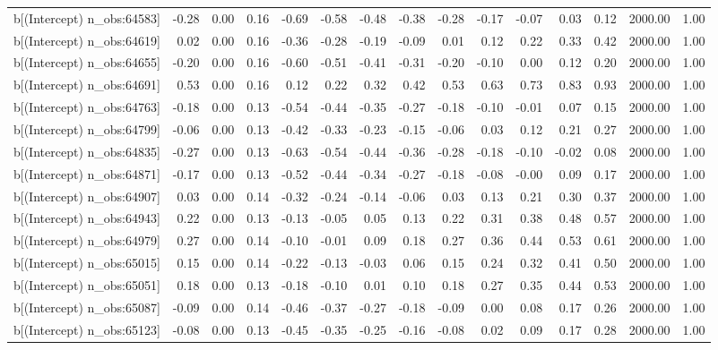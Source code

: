 \begin{table}[ht]
\begin{tabular}{rrrrrrrrrrrrrrr}
  b[(Intercept) n\_obs:64583] & -0.28 & 0.00 & 0.16 & -0.69 & -0.58 & -0.48 & -0.38 & -0.28 & -0.17 & -0.07 & 0.03 & 0.12 & 2000.00 & 1.00 \\ 
  b[(Intercept) n\_obs:64619] & 0.02 & 0.00 & 0.16 & -0.36 & -0.28 & -0.19 & -0.09 & 0.01 & 0.12 & 0.22 & 0.33 & 0.42 & 2000.00 & 1.00 \\ 
  b[(Intercept) n\_obs:64655] & -0.20 & 0.00 & 0.16 & -0.60 & -0.51 & -0.41 & -0.31 & -0.20 & -0.10 & 0.00 & 0.12 & 0.20 & 2000.00 & 1.00 \\ 
  b[(Intercept) n\_obs:64691] & 0.53 & 0.00 & 0.16 & 0.12 & 0.22 & 0.32 & 0.42 & 0.53 & 0.63 & 0.73 & 0.83 & 0.93 & 2000.00 & 1.00 \\ 
  b[(Intercept) n\_obs:64763] & -0.18 & 0.00 & 0.13 & -0.54 & -0.44 & -0.35 & -0.27 & -0.18 & -0.10 & -0.01 & 0.07 & 0.15 & 2000.00 & 1.00 \\ 
  b[(Intercept) n\_obs:64799] & -0.06 & 0.00 & 0.13 & -0.42 & -0.33 & -0.23 & -0.15 & -0.06 & 0.03 & 0.12 & 0.21 & 0.27 & 2000.00 & 1.00 \\ 
  b[(Intercept) n\_obs:64835] & -0.27 & 0.00 & 0.13 & -0.63 & -0.54 & -0.44 & -0.36 & -0.28 & -0.18 & -0.10 & -0.02 & 0.08 & 2000.00 & 1.00 \\ 
  b[(Intercept) n\_obs:64871] & -0.17 & 0.00 & 0.13 & -0.52 & -0.44 & -0.34 & -0.27 & -0.18 & -0.08 & -0.00 & 0.09 & 0.17 & 2000.00 & 1.00 \\ 
  b[(Intercept) n\_obs:64907] & 0.03 & 0.00 & 0.14 & -0.32 & -0.24 & -0.14 & -0.06 & 0.03 & 0.13 & 0.21 & 0.30 & 0.37 & 2000.00 & 1.00 \\ 
  b[(Intercept) n\_obs:64943] & 0.22 & 0.00 & 0.13 & -0.13 & -0.05 & 0.05 & 0.13 & 0.22 & 0.31 & 0.38 & 0.48 & 0.57 & 2000.00 & 1.00 \\ 
  b[(Intercept) n\_obs:64979] & 0.27 & 0.00 & 0.14 & -0.10 & -0.01 & 0.09 & 0.18 & 0.27 & 0.36 & 0.44 & 0.53 & 0.61 & 2000.00 & 1.00 \\ 
  b[(Intercept) n\_obs:65015] & 0.15 & 0.00 & 0.14 & -0.22 & -0.13 & -0.03 & 0.06 & 0.15 & 0.24 & 0.32 & 0.41 & 0.50 & 2000.00 & 1.00 \\ 
  b[(Intercept) n\_obs:65051] & 0.18 & 0.00 & 0.13 & -0.18 & -0.10 & 0.01 & 0.10 & 0.18 & 0.27 & 0.35 & 0.44 & 0.53 & 2000.00 & 1.00 \\ 
  b[(Intercept) n\_obs:65087] & -0.09 & 0.00 & 0.14 & -0.46 & -0.37 & -0.27 & -0.18 & -0.09 & 0.00 & 0.08 & 0.17 & 0.26 & 2000.00 & 1.00 \\ 
  b[(Intercept) n\_obs:65123] & -0.08 & 0.00 & 0.13 & -0.45 & -0.35 & -0.25 & -0.16 & -0.08 & 0.02 & 0.09 & 0.17 & 0.28 & 2000.00 & 1.00 \\ 

\end{tabular}
\end{table}
